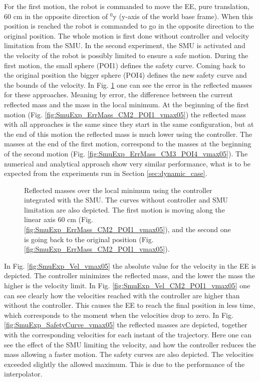 For the first motion, the robot is commanded to move the EE, pure translation, 60 cm in the opposite direction of $\mathrm{{}^{0}_{}y}$  (y-axis of the world base frame). When this position is reached the robot is commanded to go in the opposite direction to the original position.
The whole motion is first done without controller and velocity limitation from the SMU. In the second experiment, the SMU is activated and the velocity of the robot is possibly limited to ensure a safe motion. During the first motion, the small sphere (POI1) defines the safety curve. Coming back to the original position the bigger sphere (POI4) defines the new safety curve and the bounds of the velocity.
In  Fig. \ref{fig:SmuExp_ErrMass_vmax05} one can see the error in the reflected masses for these approaches. Meaning by error, the difference between the current reflected mass and the mass in the local minimum. At the beginning of the first motion (Fig. \ref{fig:SmuExp_ErrMass_CM2_POI1_vmax05}) the reflected mass with all approaches is the same since they start in the same configuration, but at the end of this motion the reflected mass is much lower using the controller. The masses at the end of the first motion, correspond to the masses at the beginning of the second motion (Fig. \ref{fig:SmuExp_ErrMass_CM3_POI4_vmax05}). The numerical and analytical approach show very similar performance, what is to be expected from the experiments run in Section \ref{sec:dynamic_case}.
%
%
%
\begin{figure}[htb!]
	\centering	
	 	 	
	\caption{Reflected masses over the local minimum using the controller integrated with the SMU. The curves without controller and  SMU limitation are also depicted. The first motion is moving along the linear axis 60 cm (Fig. \ref{fig:SmuExp_ErrMass_CM2_POI1_vmax05}), and the second one is going back to the original position (Fig. \ref{fig:SmuExp_ErrMass_CM2_POI1_vmax05}).}
	\label{fig:SmuExp_ErrMass_vmax05}
\end{figure}
%
%
In Fig. \ref{fig:SmuExp_Vel_vmax05} the absolute value for the velocity in the EE is depicted. The controller minimizes the reflected mass, and the lower the mass the higher is the velocity limit. In Fig. \ref{fig:SmuExp_Vel_CM2_POI1_vmax05} one can see clearly how the velocities reached with the controller are higher than without the controller. This causes the EE to reach the final position in less time, which corresponds to the moment when the velocities drop to zero.
In Fig. \ref{fig:SmuExp_SafetyCurve_vmax05} the reflected masses are depicted, together with the corresponding velocities for each instant of the trajectory. Here one can see the effect of the SMU limiting the velocity, and how the controller reduces the mass allowing a faster motion. The safety curves are also depicted.
%
The velocities exceeded slightly  the allowed maximum. This is due to the performance of the interpolator.

